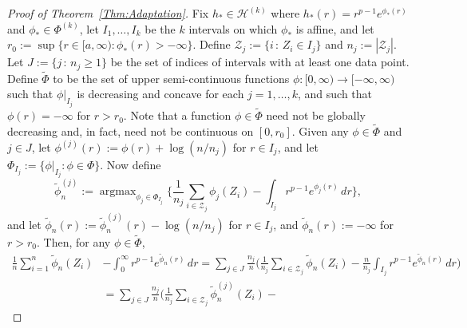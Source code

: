 \documentclass[a4paper,12pt]{article}
\DeclareMathOperator*{\argmax}{argmax}
\begin{document}
\begin{proof}[Proof of Theorem~\ref{Thm:Adaptation}]
Fix $h_* \in \mathcal{H}^{(k)}$ where $h_*(r) = r^{p-1}e^{\phi_*(r)}$ and $\phi_* \in \Phi^{(k)}$, let $I_1,\ldots, I_k$ be the $k$ intervals on which $\phi_*$ is affine, and let $r_0 := \sup\{r \in [a,\infty):\phi_*(r) > -\infty\}$. Define $\mathcal{Z}_j := \{ i \,:\, Z_i \in I_j \}$ and $n_j := | \mathcal{Z}_j |$.  Let $J := \{ j \,:\, n_j \geq 1\}$ be the set of indices of intervals with at least one data point.  Define $\tilde{\Phi}$ to be the set of upper semi-continuous functions $\phi:[0,\infty) \rightarrow [-\infty,\infty)$ such that $\phi\big|_{I_j}$ is decreasing and concave for each $j=1,\ldots,k$, and such that $\phi(r) = -\infty$ for $r > r_0$.  Note that a function $\phi \in \tilde{\Phi}$ need not be globally decreasing and, in fact, need not be continuous on $[0,r_0]$.  
Given any $\phi \in \tilde{\Phi}$ and $j \in J$, let $\phi^{(j)}(r) := \phi(r) + \log (n/n_j)$ for $r \in I_j$,  %
and let $\Phi_{I_j} := \{ \phi|_{I_j}:\phi \in \Phi\}$.  Now define 
\[
\tilde{\phi}_n^{(j)} := \argmax_{\phi_j \in \Phi_{I_j}} \biggl\{\frac{1}{n_j} \sum_{i \in \mathcal{Z}_j} \phi_j(Z_i) - \int_{I_j} r^{p-1}e^{\phi_j(r)}\, dr\biggr\},
\]
and let $\tilde{\phi}_n(r) := \tilde{\phi}_n^{(j)}(r) - \log (n/n_j)$ for $r \in I_j$, and $\tilde{\phi}_n(r) := -\infty$ for $r > r_0$.
Then, for any $\phi \in \tilde{\Phi}$,
  \begin{align}
\label{Eq:LongDisplay}
  \frac{1}{n} \sum_{i=1}^n \tilde{\phi}_n(Z_i) &- \int_0^\infty r^{p-1} e^{\tilde{\phi}_n(r)} \, dr = \sum_{j \in J} \frac{n_j}{n}\biggl(  \frac{1}{n_j} \sum_{i \in \mathcal{Z}_j} \tilde{\phi}_n(Z_i) -
      \frac{n}{n_j} \int_{I_j} r^{p-1} e^{\tilde{\phi}_n(r)} \, dr \biggr) \nonumber \\
  &= \sum_{j \in J} \frac{n_j}{n}
    \biggl(  \frac{1}{n_j} \sum_{i \in \mathcal{Z}_j} \tilde{\phi}_n^{(j)}(Z_i) -

\end{align}
\end{proof}
\end{document}
